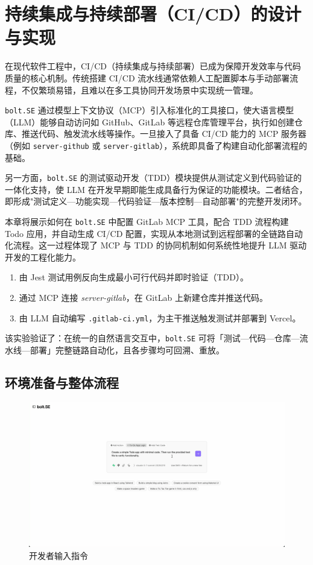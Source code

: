 
\chapter{持续集成与持续部署（CI/CD）的设计与实现}
\label{chap:mcp-tdd-cicd}

在现代软件工程中，CI/CD（持续集成与持续部署）已成为保障开发效率与代码质量的核心机制。传统搭建 CI/CD 流水线通常依赖人工配置脚本与手动部署流程，不仅繁琐易错，且难以在多工具协同开发场景中实现统一管理。

\texttt{bolt.SE} 通过模型上下文协议（MCP）引入标准化的工具接口，使大语言模型（LLM）能够自动访问如 GitHub、GitLab 等远程仓库管理平台，执行如创建仓库、推送代码、触发流水线等操作。一旦接入了具备 CI/CD 能力的 MCP 服务器（例如 \texttt{server-github} 或 \texttt{server-gitlab}），系统即具备了构建自动化部署流程的基础。

另一方面，\texttt{bolt.SE} 的测试驱动开发（TDD）模块提供从测试定义到代码验证的一体化支持，使 LLM 在开发早期即能生成具备行为保证的功能模块。二者结合，即形成"测试定义—功能实现—代码验证—版本控制—自动部署"的完整开发闭环。

本章将展示如何在 \texttt{bolt.SE} 中配置 GitLab MCP 工具，配合 TDD 流程构建 Todo 应用，并自动生成 CI/CD 配置，实现从本地测试到远程部署的全链路自动化流程。这一过程体现了 MCP 与 TDD 的协同机制如何系统性地提升 LLM 驱动开发的工程化能力。

\begin{enumerate}
  \item 由 Jest 测试用例反向生成最小可行代码并即时验证（TDD）。
  \item 通过 MCP 连接 \emph{server-gitlab}，在 GitLab 上新建仓库并推送代码。
  \item 由 LLM 自动编写 \texttt{.gitlab-ci.yml}，为主干推送触发测试并部署到 Vercel。
\end{enumerate}

该实验验证了：在统一的自然语言交互中，\texttt{bolt.SE} 可将「测试—代码—仓库—流水线—部署」完整链路自动化，且各步骤均可回溯、重放。

\section{环境准备与整体流程}
\label{sec:cicd-overview}

\begin{figure}[htbp]
    \centering
    \includegraphics[width=.8\textwidth]{figures/screenshots/ci-cd/ci_prompt.png}
    \caption{开发者输入指令}
    \label{fig:ci_prompt}
\end{figure}

